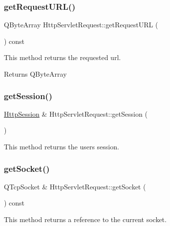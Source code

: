 \subsubsection{\texorpdfstring{get\+Request\+U\+R\+L()}{getRequestURL()}}
{\footnotesize\ttfamily Q\+Byte\+Array Http\+Servlet\+Request\+::get\+Request\+U\+RL (\begin{DoxyParamCaption}{ }\end{DoxyParamCaption}) const}



This method returns the requested url. 

\begin{DoxyReturn}{Returns}
Q\+Byte\+Array 
\end{DoxyReturn}
\mbox{\label{class_http_servlet_request_a8e9c96dda35d8519290330258aa730c7}} 
\subsubsection{\texorpdfstring{get\+Session()}{getSession()}}
{\footnotesize\ttfamily \hyperlink{class_http_session}{Http\+Session} \& Http\+Servlet\+Request\+::get\+Session (\begin{DoxyParamCaption}{ }\end{DoxyParamCaption})}



This method returns the user\textquotesingle{}s session. 

\mbox{\label{class_http_servlet_request_ab2d9f9c1b6189a536a5c76dbb2c9dd70}} 
\subsubsection{\texorpdfstring{get\+Socket()}{getSocket()}}
{\footnotesize\ttfamily Q\+Tcp\+Socket \& Http\+Servlet\+Request\+::get\+Socket (\begin{DoxyParamCaption}{ }\end{DoxyParamCaption}) const}



This method returns a reference to the current socket. 

